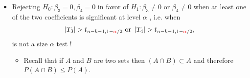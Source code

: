 \documentclass[notes=show,compress,beamer]{beamer}
\begin{document}
\begin{frame}%


\begin{itemize}
\item Rejecting $H_{0}:\beta _{3}=0,\beta _{4}=0$ in favor of $H_{1}:\beta
_{3}\neq 0$ or $\beta _{4}\neq 0$ when 
\color{blue}%
at least 
\color{black}%
one of the two coefficients is significant at 
\color{blue}%
level $\alpha $ 
\color{black}%
, i.e. when%
\begin{equation*}
\left\vert T_{3}\right\vert >t_{n-k-1,1-%
\color{red}%
\alpha 
\color{black}%
/2}\text{ or }\left\vert T_{4}\right\vert >t_{n-k-1,1-%
\color{red}%
\alpha 
\color{black}%
/2},
\end{equation*}%
\color{red}%
is not 
\color{black}%
a 
\color{blue}%
size $\alpha $ test%
\color{black}%
! 
\pause%

\begin{itemize}
\item Recall that if $A$ and $B$ are two sets 
\pause%
then $\left( A\cap B\right) \subset A$ 
\pause%
and therefore $P\left( A\cap B\right) \leq P\left( A\right) .$%
\pause%


\end{itemize}
\end{itemize}
\end{frame}
\end{document}
